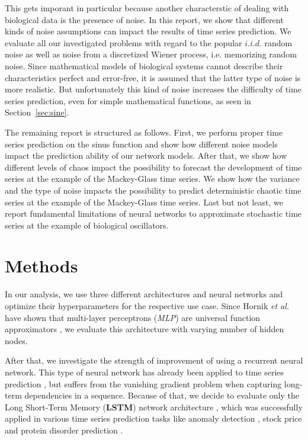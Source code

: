 \documentclass{article}
\begin{document}
This gets imporant in particular because another characterstic of dealing with
biological data is the presence of noise. In
this report, we show that different kinds of noise assumptions can impact the
results of time series prediction. We evaluate all our investigated problems
with regard to the popular $i.i.d.$ random noise as well as noise from a
discretized Wiener process, i.e. memorizing random
noise. Since mathematical models of biological systems cannot describe their
characteristics perfect and error-free, it is assumed that the latter type of
noise is more realistic. But unfortunately this kind of noise increases the
difficulty of time series prediction, even for simple mathematical functions,
as seen in Section~\ref{sec:sine}.

The remaining report is structured as follows. First, we perform proper time
series prediction on the sinus function and show how different noise models
impact the prediction ability of our network models. After that, we show how
different levels of chaos impact the possibility to forecast the development
of time series at the example of the Mackey-Glass time series. We show
how the variance and the type
of noise impacts the possibility to predict deterministic
chaotic time series at the example of the Mackey-Glass time series. Last
but not least, we report fundamental limitations of neural networks to
approximate stochastic time series at the example of biological oscillators.

\section{Methods}

In our analysis, we use three different architectures and neural networks and
optimize their hyperparameters for the respective use case. Since Hornik
\textit{et al.} have shown that multi-layer perceptrons (\emph{MLP})
are universal
function approximators \cite{hornik1989}, we evaluate this architecture with
varying number of hidden nodes.

After that, we investigate the strength of
improvement of using a recurrent neural network. This type of neural network has
already been applied to time series prediction \cite{connor1994}, but suffers
from the vanishing gradient problem when capturing long-term dependencies in a
sequence. Because of that, we decide to evaluate only the Long Short-Term Memory
(\textbf{LSTM})
network architecture \cite{hochreiter1997}, which was successfully applied in
various time series prediction tasks like anomaly detection \cite{malhotra2015},
stock price \cite{fischer2018} and protein disorder prediction
\cite{hanson2016}.
\end{document}
